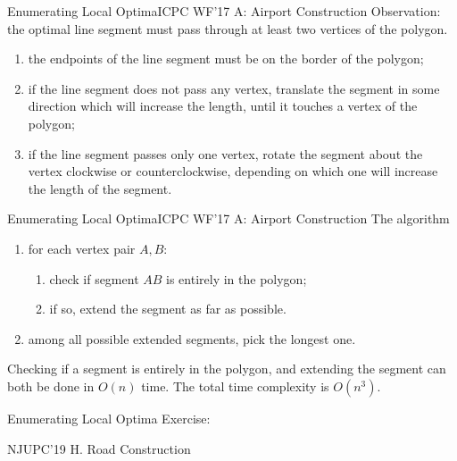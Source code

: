 \documentclass{beamer}
\begin{document}
\begin{frame}{Enumerating Local Optima}{ICPC WF'17 A: Airport Construction}
Observation: the optimal line segment must pass through at least two vertices of the polygon.

\pause

\begin{enumerate}[<+->]
	\item the endpoints of the line segment must be on the border of the polygon;
	\item if the line segment does not pass any vertex, translate the segment in some direction which will increase the length, until it touches a vertex of the polygon;
	\item if the line segment passes only one vertex, rotate the segment about the vertex clockwise or counterclockwise, depending on which one will increase the length of the segment.
\end{enumerate}
\end{frame}

\begin{frame}{Enumerating Local Optima}{ICPC WF'17 A: Airport Construction}
The algorithm
\begin{enumerate}
	\item for each vertex pair $A, B$:
	\begin{enumerate}
		\item check if segment $AB$ is entirely in the polygon;
		\item if so, extend the segment as far as possible.
	\end{enumerate}
	\item among all possible extended segments, pick the longest one.
\end{enumerate}

\pause

Checking if a segment is entirely in the polygon, and extending the segment can both be done in $O(n)$ time. The total time complexity is $O(n^3)$.
\end{frame}

\begin{frame}[fragile]{Enumerating Local Optima}
Exercise: 

NJUPC'19 H. Road Construction
\end{frame}
\end{document}

